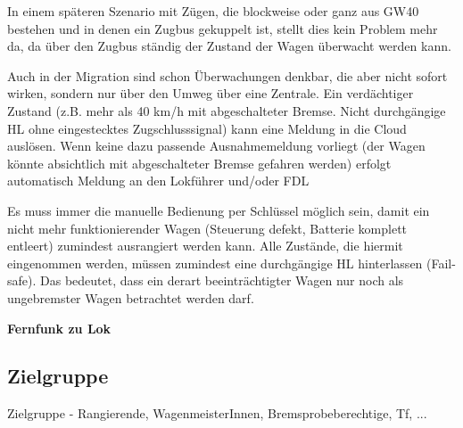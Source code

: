 In einem späteren Szenario mit Zügen, die blockweise oder ganz aus GW40 bestehen und in denen ein Zugbus gekuppelt ist, stellt dies kein Problem mehr da, da über den Zugbus ständig der Zustand der Wagen überwacht werden kann.\par
Auch in der Migration sind schon Überwachungen denkbar, die aber nicht sofort wirken, sondern nur über den Umweg über eine Zentrale. Ein verdächtiger Zustand (z.B. mehr als 40 km/h mit abgeschalteter Bremse. Nicht durchgängige HL ohne eingestecktes Zugschlusssignal) kann eine Meldung in die Cloud auslösen. Wenn keine dazu passende Ausnahmemeldung vorliegt (der Wagen könnte absichtlich mit abgeschalteter Bremse gefahren werden) erfolgt automatisch Meldung an den Lokführer und/oder FDL\par
Es muss immer die manuelle Bedienung per Schlüssel möglich sein, damit ein nicht mehr funktionierender Wagen (Steuerung defekt, Batterie komplett entleert) zumindest ausrangiert werden kann. Alle Zustände, die hiermit eingenommen werden, müssen zumindest eine durchgängige HL hinterlassen (Fail-safe). Das bedeutet, dass ein derart beeinträchtigter Wagen nur noch als ungebremster Wagen betrachtet werden darf.


\textbf{Fernfunk zu Lok}
\subsection{Zielgruppe}
Zielgruppe - Rangierende, WagenmeisterInnen, Bremsprobeberechtige, Tf, ...